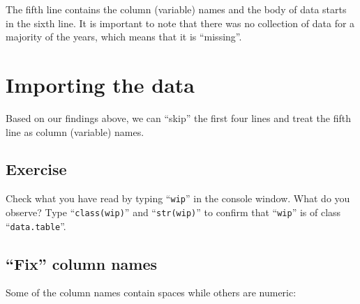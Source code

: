\documentclass[a4paper,9pt,twocolumn,twoside,printwatermark=true]{pinp}
\begin{document}
The fifth line contains the column (variable) names and the body of data
starts in the sixth line. It is important to note that there was no
collection of data for a majority of the years, which means that it is
``missing''.

\section{Importing the data}\label{importing-the-data}

Based on our findings above, we can ``skip'' the first four lines and
treat the fifth line as column (variable) names.

\begin{Shaded}
\begin{Highlighting}[]
\StringTok{ }\NormalTok{(}\NormalTok{(}\NormalTok{, }\NormalTok{), }
              \NormalTok{, } \NormalTok{)}
\end{Highlighting}
\end{Shaded}

\subsection{Exercise}\label{exercise-1}

Check what you have read by typing ``\texttt{wip}'' in the console
window. What do you observe? Type ``\texttt{class(wip)}'' and
``\texttt{str(wip)}'' to confirm that ``\texttt{wip}'' is of class
``\texttt{data.table}''.

\subsection{\texorpdfstring{``Fix'' column
names}{Fix column names}}\label{fix-column-names}

Some of the column names contain spaces while others are numeric:

\begin{Shaded}
\begin{Highlighting}[]
\NormalTok{(}
\NormalTok{(}
\end{Highlighting}
\end{Shaded}
\end{document}
